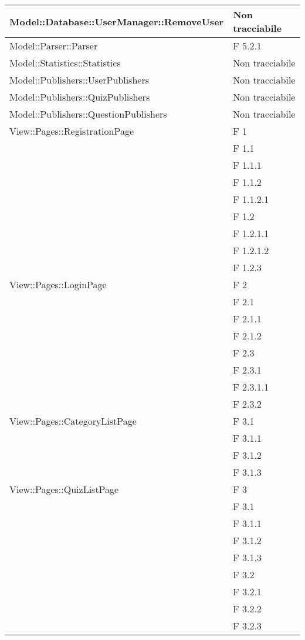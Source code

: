 \begin{longtable}{p{}p{}}
\midrule
Model::Database::UserManager::RemoveUser	& Non tracciabile\\

\midrule
Model::Parser::Parser		& F 5.2.1\\

\midrule
Model::Statistics::Statistics	& Non tracciabile\\

\midrule
Model::Publishers::UserPublishers	& Non tracciabile\\

\midrule
Model::Publishers::QuizPublishers	& Non tracciabile\\

\midrule
Model::Publishers::QuestionPublishers	& Non tracciabile\\


\midrule
View::Pages::RegistrationPage	& F 1\\
								& F 1.1\\
								& F 1.1.1\\
								& F 1.1.2\\
								& F 1.1.2.1\\
								& F 1.2\\
								& F 1.2.1.1\\
								& F 1.2.1.2\\
								& F 1.2.3\\
\midrule
View::Pages::LoginPage			& F 2\\
								& F 2.1\\
								& F 2.1.1\\
								& F 2.1.2\\
								& F 2.3\\
								& F 2.3.1\\
								& F 2.3.1.1\\
								& F 2.3.2\\
								
\midrule
View::Pages::CategoryListPage					& F 3.1\\
								& F 3.1.1\\
								& F 3.1.2\\
								& F 3.1.3\\

\midrule
View::Pages::QuizListPage					& F 3\\
								& F 3.1\\
								& F 3.1.1\\
								& F 3.1.2\\
								& F 3.1.3\\
								& F 3.2\\
								& F 3.2.1\\
								& F 3.2.2\\
								& F 3.2.3\\
								

\end{longtable}
